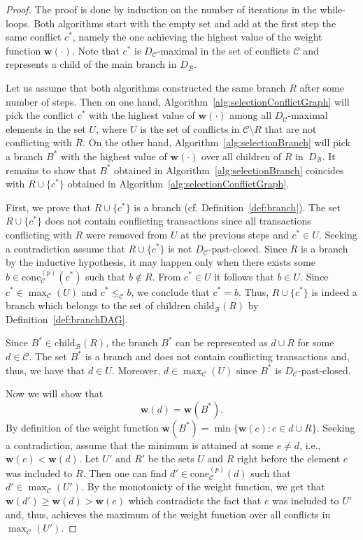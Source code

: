 \documentclass[11pt]{article}
\newcommand{\AW}{\mathbf{w}}
\newcommand{\branchset}{\mathcal{B}}
\newcommand{\conflictset}{\mathcal{C}}
\newcommand{\ConflictDAG}{D_{\conflictset}}
\newcommand{\BranchDAG}{D_{\branchset}}
\newcommand{\cone}[3]{\mathrm{cone}_{#2}^{(#1)}\left(#3\right)}
\newcommand{\child}[2]{\mathrm{child}_{#1}\left(#2\right)}
\theoremstyle{plain}
\theoremstyle{definition}
\numberwithin{definition}{section}
\numberwithin{lemma}{section}
\numberwithin{ass}{section}
\numberwithin{remark}{section}
\numberwithin{example}{section}
\numberwithin{proposition}{section}
\numberwithin{theorem}{section}
\begin{document}
\begin{proof}
The proof is done by induction on the number of iterations in the while-loops. Both algorithms start with the empty set and add at the first step the same conflict $c^{*}$, namely the one achieving the highest value of the weight function $\AW(\cdot)$. Note that $c^{*}$ is $\ConflictDAG$-maximal in the set of conflicts $\conflictset$ and represents a child of the main branch in $\BranchDAG$.

Let us assume that both algorithms constructed the same branch ${R}$ after some number of steps. 
Then on one hand, Algorithm~\ref{alg:selectionConflictGraph} will pick the conflict $c^*$ with the highest value of $\AW(\cdot)$ among all $\ConflictDAG$-maximal elements in the set $U$, where $U$ is the set of conflicts in $\conflictset\setminus {R}$ that are not conflicting with ${R}$. 
On the other hand, Algorithm~\ref{alg:selectionBranch} will pick a branch ${B}^*$ with the highest value of $\AW(\cdot)$ over all children of ${R}$ in~$\BranchDAG$. It remains to show that ${B}^*$ obtained in Algorithm~\ref{alg:selectionBranch} coincides with  ${R}\cup \{c^*\}$ obtained in Algorithm~\ref{alg:selectionConflictGraph}. 

First, we prove that ${R}\cup \{c^*\}$ is a branch (cf. Definition~\ref{def:branch}).  The set ${R}\cup \{c^*\}$ does not contain conflicting transactions since all transactions conflicting with ${R}$ were removed from $U$ at the previous steps  and $c^{*}\in U$. Seeking a contradiction assume that ${R}\cup \{c^*\}$ is not $\ConflictDAG$-past-closed. Since ${R}$ is a branch by the inductive hypothesis, it may happen only when there exists some $b\in \cone{p}{\conflictset}{c^{*}}$ such that $b\not\in {R}$. From $c^*\in U$ it follows that $b\in U$. Since $c^*\in \max_{\conflictset}(U)$ and $c^*\le_{\conflictset} b$, we conclude that $c^*=b$. Thus,  ${R}\cup \{c^*\}$ is indeed a branch which belongs to the set of children $\child{\branchset}{R}$ by Definition~\ref{def:branchDAG}.

Since ${B}^*\in \child{\branchset}{R}$, the branch ${B}^*$ can be represented as $d\cup {R}$ for some $d\in\conflictset$. The set ${B}^*$ is a branch and does not contain conflicting transactions and, thus, we have that $d\in U$. Moreover, $d\in \max_{\conflictset}(U)$ since ${B}^*$ is $\ConflictDAG$-past-closed. 

Now we will show that 
\begin{equation}\label{eq: weight of d is equal}
\AW(d)=\AW({B}^*).
\end{equation}
By definition of the weight function $\AW({B}^*)=\min\{\AW(c) : c\in d\cup {R}\}$. Seeking a contradiction, assume that the minimum is attained at some $e \neq d$, i.e., $\AW(e)<\AW(d)$. Let $U'$ and ${R}'$ be the sets $U$ and ${R}$ right before the element $e$ was included to ${R}$. Then one can find $d'\in\cone{p}{\conflictset}{d}$ such that $d'\in\max_{\conflictset}(U')$. By the monotonicty of the weight function, we get that $\AW(d')\ge \AW(d)>\AW(e)$ which contradicts the fact that $e$ was included to $U'$ and, thus, achieves the maximum of the weight function over all conflicts in $\max_{\conflictset}(U')$.


\end{proof}
\end{document}

